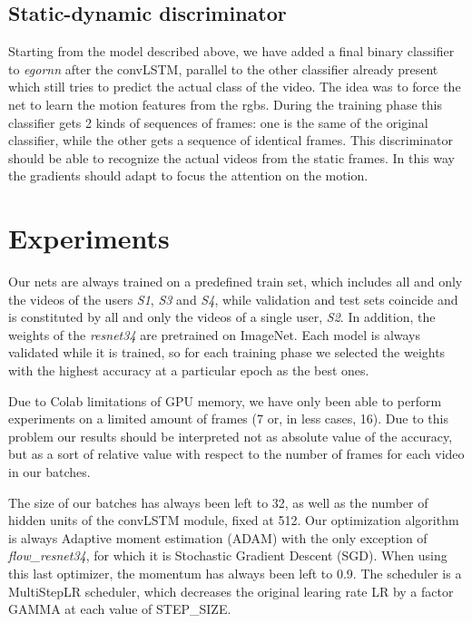 \documentclass[10pt,twocolumn,hidelinks,letterpaper]{article}
\begin{document}
\subsection{Static-dynamic discriminator}
\label{ds_section}
Starting from the model described above, we have added a final binary classifier to \textit{egornn} after the convLSTM, parallel to the other classifier already present which still tries to predict the actual class of the video. The idea was to force the net to learn the motion features from the rgbs. During the training phase this classifier gets 2 kinds of sequences of frames: one is the same of the original classifier, while the other gets a sequence of identical frames. This discriminator should be able to recognize the actual videos from the static frames. In this way the gradients should adapt to focus the attention on the motion.

\section{Experiments}

Our nets are always trained on a predefined train set, which includes all and only the videos of the users \textit{S1}, \textit{S3} and \textit{S4}, while validation and test sets coincide and is constituted by all and only the videos of a single user, \textit{S2}. In addition, the weights of the \textit{resnet34} are pretrained on ImageNet. Each model is always validated while it is trained, so for each training phase we selected the weights with the highest accuracy at a particular epoch as the best ones.

Due to Colab limitations of GPU memory, we have only been able to perform experiments on a limited amount of frames (7 or, in less cases, 16). Due to this problem our results should be interpreted not as absolute value of the accuracy, but as a sort of relative value with respect to the number of frames for each video in our batches.

The size of our batches has always been left to 32, as well as the number of hidden units of the convLSTM module, fixed at 512. Our optimization algorithm is always Adaptive moment estimation (ADAM) with the only exception of \textit{flow\_resnet34}, for which it is Stochastic Gradient Descent (SGD). When using this last optimizer, the momentum has always been left to 0.9. The scheduler is a MultiStepLR scheduler, which decreases the original learing rate LR by a factor GAMMA at each value of STEP\_SIZE.
\end{document}
